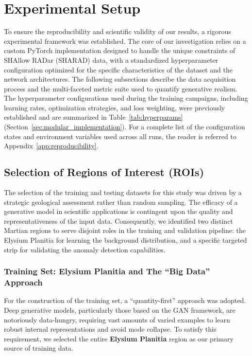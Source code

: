 \section{Experimental Setup}
\label{sec:experimental_setup}
To ensure the reproducibility and scientific validity of our results, a rigorous experimental framework was established.
The core of our investigation relies on a custom PyTorch implementation designed to handle the unique constraints of SHAllow RADar (SHARAD) data, with a standardized hyperparameter configuration optimized for the specific characteristics of the dataset and the network architectures.
The following subsections describe the data acquisition process and the multi-faceted metric suite used to quantify generative realism.
The hyperparameter configurations used during the training campaigns, including learning rates, optimization strategies, and loss weighting, were previously established and are summarized in Table~\ref{tab:hyperparams} (Section~\ref{sec:modular_implementation}).
For a complete list of the configuration states and environment variables used across all runs, the reader is referred to Appendix~\ref{app:reproducibility}.

\subsection{Selection of Regions of Interest (ROIs)}
\label{subsec:roi_selection}
The selection of the training and testing datasets for this study was driven by a strategic geological assessment rather than random sampling.
The efficacy of a generative model in scientific applications is contingent upon the quality and representativeness of the input data.
Consequently, we identified two distinct Martian regions to serve disjoint roles in the training and validation pipeline: the Elysium Planitia for learning the background distribution, and a specific targeted strip for validating the anomaly detection capabilities.

\subsubsection{Training Set: Elysium Planitia and The \enquote{Big Data} Approach}
For the construction of the training set, a \enquote{quantity-first} approach was adopted.
Deep generative models, particularly those based on the GAN framework, are notoriously data-hungry, requiring vast amounts of varied examples to learn robust internal representations and avoid mode collapse.
To satisfy this requirement, we selected the entire \textbf{Elysium Planitia} region as our primary source of training data.

